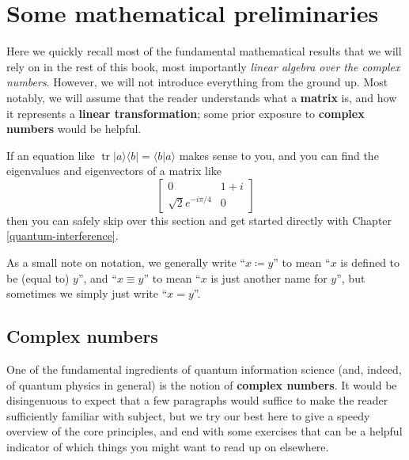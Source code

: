 \documentclass[fleqn,a4paper]{article}
\let\oldsection\section
\renewcommand\section{\clearpage\oldsection}
\theoremstyle{definition}
\theoremstyle{definition}
\theoremstyle{definition}
\theoremstyle{definition}
\theoremstyle{remark}
\begin{document}
\pagestyle{fancy}

\hypertarget{some-mathematical-preliminaries}{%
\section*{Some mathematical preliminaries}\label{some-mathematical-preliminaries}}

Here we quickly recall most of the fundamental mathematical results that we will rely on in the rest of this book, most importantly \emph{linear algebra over the complex numbers}.
However, we will not introduce everything from the ground up.
Most notably, we will assume that the reader understands what a \textbf{matrix} is, and how it represents a \textbf{linear transformation}; some prior exposure to \textbf{complex numbers} would be helpful.

If an equation like \(\operatorname{tr}|a\rangle\langle b|=\langle b|a\rangle\) makes sense to you, and you can find the eigenvalues and eigenvectors of a matrix like
\[
  \begin{bmatrix}
    0 & 1+i
  \\\sqrt{2}e^{-i\pi/4} & 0
  \end{bmatrix}
\]
then you can safely skip over this section and get started directly with Chapter \ref{quantum-interference}.

As a small note on notation, we generally write ``\(x\coloneqq y\)'' to mean ``\(x\) is defined to be (equal to) \(y\)'', and ``\(x\equiv y\)'' to mean ``\(x\) is just another name for \(y\)'', but sometimes we simply just write ``\(x=y\)''.

\hypertarget{complex-numbers}{%
\subsection{Complex numbers}\label{complex-numbers}}

One of the fundamental ingredients of quantum information science (and, indeed, of quantum physics in general) is the notion of \textbf{complex numbers}.
It would be disingenuous to expect that a few paragraphs would suffice to make the reader sufficiently familiar with subject, but we try our best here to give a speedy overview of the core principles, and end with some exercises that can be a helpful indicator of which things you might want to read up on elsewhere.
\end{document}
